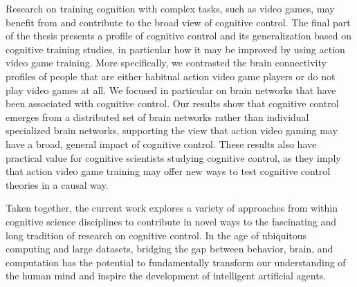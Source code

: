 Research on training cognition with complex tasks, such as video games, may benefit from and contribute to the broad view of cognitive control. The final part of the thesis presents a profile of cognitive control and its generalization based on cognitive training studies, in particular how it may be improved by using action video game training. More specifically, we contrasted the brain connectivity profiles of people that are either habitual action video game players or do not play video games at all. We focused in particular on brain networks that have been associated with cognitive control. Our results show that cognitive control emerges from a distributed set of brain networks rather than individual specialized brain networks, supporting the view that action video gaming may have a broad, general impact of cognitive control. These results also have practical value for cognitive scientists studying cognitive control, as they imply that action video game training may offer new ways to test cognitive control theories in a causal way.

Taken together, the current work explores a variety of approaches from within cognitive science disciplines to contribute in novel ways to the fascinating and long tradition of research on cognitive control. In the age of ubiquitous computing and large datasets, bridging the gap between behavior, brain, and computation has the potential to fundamentally transform our understanding of the human mind and inspire the development of intelligent artificial agents.


\newpage